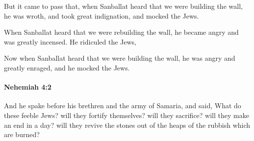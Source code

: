 			\begin{versebox}
					\item[BHS] 
					\item[LXX] 
					\item[ASV] But it came to pass that, when Sanballat heard that we were building the wall, he was wroth, and took great indignation, and mocked the Jews.
					\item[NIV] When Sanballat heard that we were rebuilding the wall, he became angry and was greatly incensed. He ridiculed the Jews,
					\item[NRSV] Now when Sanballat heard that we were building the wall, he was angry and greatly enraged, and he mocked the Jews.
			\end{versebox}

		\paragraph{Nehemiah 4:2} %
			\label{NEHEMIAH-4-2}

			And he spake before his brethren and the army of Samaria, and said, What do these feeble Jews? will they fortify themselves? will they sacrifice? will they make an end in a day? will they revive the stones out of the heaps of the rubbish which are burned?

